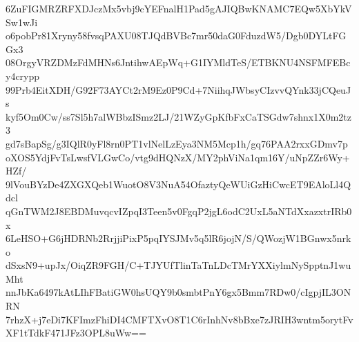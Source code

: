 6ZuFIGMRZRFXDJczMx5vbj9cYEFnalH1Pad5gAJIQBwKNAMC7EQw5XbYkVSw1wJi
o6pobPr81Xryny58fvsqPAXU08TJQdBVBc7mr50daG0FduzdW5/Dgb0DYLtFGGx3
08OrgyVRZDMzFdMHNs6JntihwAEpWq+G1IYMldTeS/ETBKNU4NSFMFEBcy4crypp
99Prb4EitXDH/G92F73AYCt2rM9Ez0P9Cd+7NiihqJWbsyCIzvvQYnk33jCQeuJs
kyf5Om0Cw/ss7Sl5h7alWBbzISmz2LJ/21WZyGpKfbFxCaTSGdw7shnx1X0m2tz3
gd7sBapSg/g3IQlR0yFl8rn0PT1vlNelLzEya3NM5Mcp1h/gq76PAA2rxxGDmv7p
oXOS5YdjFvTsLwsfVLGwCo/vtg9dHQNzX/MY2phViNa1qm16Y/uNpZZr6Wy+HZf/
9lVouBYzDe4ZXGXQeb1WuotO8V3NuA54OfaztyQeWUiGzHiCwcET9EAloLl4Qdcl
qGnTWM2J8EBDMuvqcvIZpqI3Teen5v0FgqP2jgL6odC2UxL5aNTdXxazxtrIRb0x
6LeHSO+G6jHDRNb2RrjjiPixP5pqIYSJMv5q5lR6jojN/S/QWozjW1BGnwx5nrko
dSxsN9+upJx/OiqZR9FGH/C+TJYUfTlinTaTnLDcTMrYXXiylmNySpptnJ1wuMht
nnJbKa6497kAtLIhFBatiGW0hsUQY9b0smbtPnY6gx5Bmm7RDw0/cIgpjIL3ONRN
7rhzX+j7eDi7KFImzFhiDI4CMFTXvO8T1C6rInhNv8bBxe7zJRIH3wntm5orytFv
XF1tTdkF471JFz3OPL8uWw==
